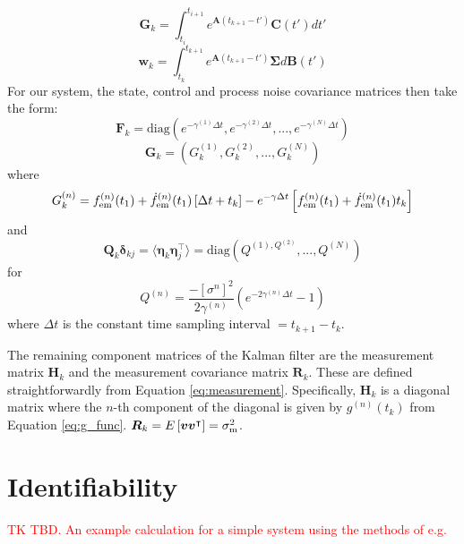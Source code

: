 \documentclass[fleqn,usenatbib,useAMS]{mnras}
\providecommand{\DIFadd}[1]{{\protect\color{blue}\uwave{#1}}} %
\providecommand{\DIFaddbegin}{} %
\providecommand{\DIFaddend}{} %
\newcommand{\DIFaddincludegraphics}[2][]{{\color{blue}\fbox{\DIFOincludegraphics[#1]{#2}}}} %
\DeclareRobustCommand{\DIFaddbegin}{\DIFOaddbegin \let\includegraphics\DIFaddincludegraphics} %
\DeclareRobustCommand{\DIFaddend}{\DIFOaddend \let\includegraphics\DIFOincludegraphics} %
\begin{document}
\begin{equation}
	\boldsymbol{G}_k = \int_{t_i}^{t_{i+1}}  e^{\boldsymbol{A}\left( t_{k+1} - t' \right)}  \boldsymbol{C}(t') dt' 
\end{equation}
\begin{equation}
	\boldsymbol{w}_k = \int_{t_k}^{t_{k+1}} e^{\boldsymbol{A}\left( t_{k+1} - t' \right)} \boldsymbol{\Sigma} d \boldsymbol{B}(t')
	\end{equation}
For our system, the state, control and process noise covariance matrices then take the form:
\begin{equation}
	\boldsymbol{F}_k = 	\text{diag}\left(e^{- \gamma^{(1)} \Delta t},e^{- \gamma^{(2)} \Delta t},...,e^{- \gamma^{(N)} \Delta t} \right)
\end{equation}
\begin{equation}
\boldsymbol{G}_k	= \left(G^{(1)}_k, G^{(2)}_k,...,G^{(N)}_k \right)
\end{equation}
where
\begin{equation}
	G_k^{(n)} =    f^{(n)}_{\rm em}(t_1) + \dot{f}^{(n)}_{\rm em}(t_1)  \left[\Delta t + t_k \right] - e^{-\gamma \Delta t} \left[  f^{(n)}_{\rm em}(t_1) +\dot{f}^{(n)}_{\rm em}(t_1)  t_k \right]
\end{equation}
and
\begin{equation}
	\boldsymbol{Q}_k \boldsymbol{\delta}_{kj}= \langle \boldsymbol{\eta}_k \boldsymbol{\eta}_j^\intercal \rangle = \text{diag} \left(Q^{(1), Q^{(2)}},...,Q^{(N)}\right) 
\end{equation}
for 
\begin{equation}
	Q^{(n)} = \frac{- [\sigma^{n}]^2}{2 \gamma^{(n)}} \left( e^{-2 \gamma^{(n)} \Delta t} -1\right)
\end{equation}
where $\Delta t$ is the constant time sampling interval $=t_{k+1} -t_{k}$. \newline 

The remaining component matrices of the Kalman filter are the measurement matrix $\boldsymbol{H}_k$ and the measurement covariance matrix $\boldsymbol{R}_k$. These are defined straightforwardly from Equation \eqref{eq:measurement}. Specifically, 
$\boldsymbol{H}_k$ is a diagonal matrix where the $n$-th component of the diagonal is given by $g^{(n)}(t_k)$ from Equation \eqref{eq:g_func}. $\boldsymbol{R}_k = E \left[ \boldsymbol{v} \boldsymbol{v}^\intercal \right] = \sigma^2_{\rm m}$.






\DIFaddbegin \section{\DIFadd{Fiducial pulsar values}}\label{appendix_fiducial}
\DIFadd{\textcolor{red}{TK TBD} 
}\DIFaddend \section{Identifiability}\label{appendix_identifiability}
\textcolor{red}{TK TBD. An example calculation for a simple system using the methods of e.g. } \citep{KARLSSON2012941} \citep{SEDOGLAVIC2002735}
\end{document}
